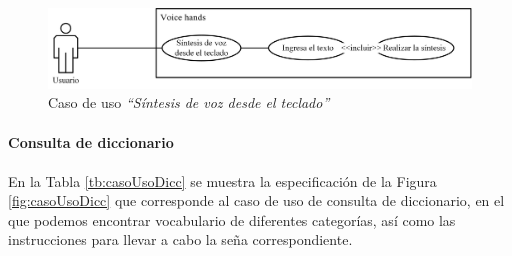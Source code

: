 		\begin{figure}[H]
			\centering
			\includegraphics[width=0.8\linewidth]{figures/casoUsoSintesis}
			\caption{Caso de uso \textit{``Síntesis de voz desde el teclado''}}
			\label{fig:casoUsoSintesis}
		\end{figure}
		
\paragraph{Consulta de diccionario}\paragraph{}

En la Tabla \ref{tb:casoUsoDicc} se muestra la especificación de la Figura \ref{fig:casoUsoDicc} que corresponde al caso de uso de consulta de diccionario, en el que podemos encontrar vocabulario de diferentes categorías, así como las instrucciones para llevar a cabo la seña correspondiente.

